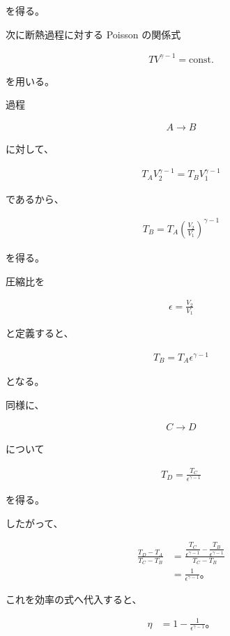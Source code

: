 \documentclass[platex,dvipdfmx,a4paper]{jsarticle}
\begin{document}
を得る。

次に断熱過程に対する Poisson の関係式

\begin{align*}
TV^{\gamma-1}
=
\mathrm{const.}
\end{align*}

を用いる。

過程

\begin{align*}
A\rightarrow B
\end{align*}

に対して、

\begin{align*}
T_AV_2^{\gamma-1}
=
T_BV_1^{\gamma-1}
\end{align*}

であるから、

\begin{align*}
T_B
=
T_A
\left(
\frac{V_2}{V_1}
\right)^{\gamma-1}
\end{align*}

を得る。

圧縮比を

\begin{align*}
\epsilon
=
\frac{V_2}{V_1}
\end{align*}

と定義すると、

\begin{align*}
T_B=T_A\epsilon^{\gamma-1}
\end{align*}

となる。

同様に、

\begin{align*}
C\rightarrow D
\end{align*}

について

\begin{align*}
T_D
=
\frac{T_C}{\epsilon^{\gamma-1}}
\end{align*}

を得る。

したがって、

\begin{align*}
\frac{T_D-T_A}
{T_C-T_B}
&=
\frac{
\dfrac{T_C}{\epsilon^{\gamma-1}}
-\dfrac{T_B}{\epsilon^{\gamma-1}}
}
{T_C-T_B} \\
&=
\frac{1}{\epsilon^{\gamma-1}}。
\end{align*}

これを効率の式へ代入すると、

\begin{align*}
\eta
&=
1-
\frac{1}{\epsilon^{\gamma-1}}。
\end{align*}
\end{document}

